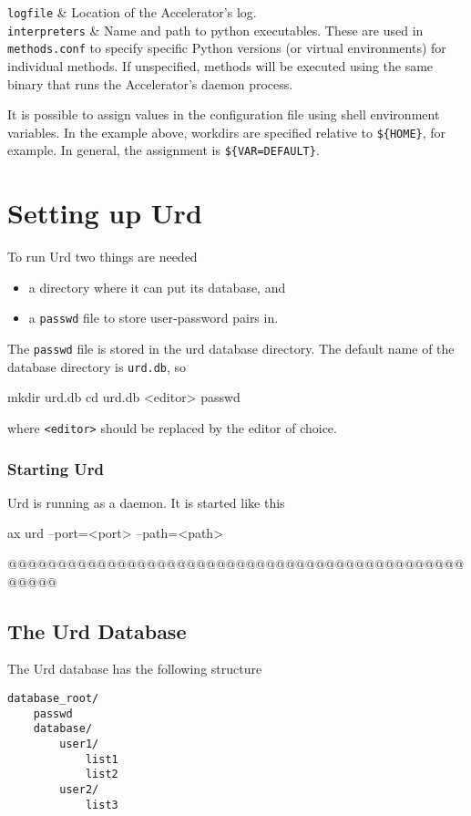 \RPtwo \texttt{logfile} & Location of the Accelerator's log.\\[1ex]

\RPtwo \texttt{interpreters} & Name and path to python executables.
These are used in \texttt{methods.conf} to specify specific Python
versions (or virtual environments) for individual methods.  If
unspecified, methods will be executed using the same binary that runs
the Accelerator's daemon process.\\[1ex]

\stoptabletwo

It is possible to assign values in the configuration file using shell
environment variables.  In the example above, workdirs are specified
relative to \texttt{\$\{HOME\}}, for example.  In general, the
assignment is \texttt{\$\{VAR=DEFAULT\}}.



\clearpage

\section{Setting up Urd}
\label{sec:urd_setup}

To run Urd two things are needed
\begin{itemize}
\item[] a directory where it can put its database, and
\item[] a \texttt{passwd} file to store user-password pairs in.
\end{itemize}
The \texttt{passwd} file is stored in the urd database directory.  The
default name of the database directory is \texttt{urd.db}, so
\begin{shell}
mkdir urd.db
cd urd.db
<editor> passwd
\end{shell}
where \texttt{<editor>} should be replaced by the editor of choice.


\subsubsection{Starting Urd}
Urd is running as a daemon.  It is started like this
\begin{shell}
ax urd --port=<port> --path=<path>
\end{shell}
@@@@@@@@@@@@@@@@@@@@@@@@@@@@@@@@@@@@@@@@@@@@@@@@@@@


\subsection{The Urd Database}
The Urd database has the following structure
\begin{verbatim}
database_root/
    passwd
    database/
        user1/
            list1
            list2
        user2/
            list3
\end{verbatim}



